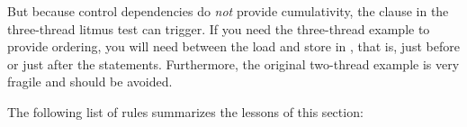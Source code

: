 But because control dependencies do \emph{not} provide cumulativity, the
 clause in the three-thread litmus test can trigger.
If you need the three-thread example to provide ordering, you will need
 between the load and store in ,
that is, just before or just after the  statements.
Furthermore, the original two-thread example is very fragile and should be avoided.

\QuickQuizEnd

The following list of rules summarizes the lessons of this section:

